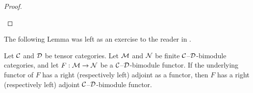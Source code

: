 \documentclass{amsart}
\begin{document}
\begin{proof}
\begin{center}
   
\end{center}
\end{proof}

The following Lemma was left as an exercise to the reader in \cite[\S 3.3]{EO-ftc}.

\begin{lemma} \label{lma:module-adjoint}
Let $\mathcal C$ and $\mathcal D$ be tensor categories. Let  $\mathcal M$ and  $\mathcal N$  be finite $\mathcal C$--$\mathcal D$-bimodule categories, and let $F: \mathcal M \to \mathcal N$ be a $\mathcal C$--$\mathcal D$-bimodule functor.  If the underlying functor of $F$ has a right (respectively left) adjoint as a functor, then $F$ has a right (respectively left) adjoint $\mathcal C$--$\mathcal D$-bimodule functor.   
\end{lemma}
\end{document}
